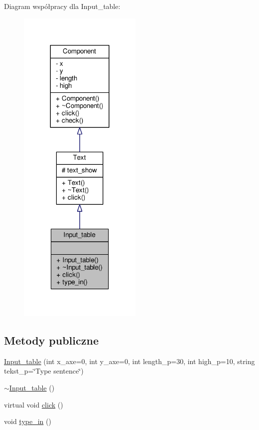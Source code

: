 Diagram współpracy dla Input\+\_\+table\+:
\nopagebreak
\begin{figure}[H]
\begin{center}
\leavevmode
\includegraphics[width=168pt]{classInput__table__coll__graph}
\end{center}
\end{figure}
\subsection*{Metody publiczne}
\begin{DoxyCompactItemize}
\item 
\hyperlink{classInput__table_a45587a7a164f060d4bc10e30e2226e5d}{Input\+\_\+table} (int x\+\_\+axe=0, int y\+\_\+axe=0, int length\+\_\+p=30, int high\+\_\+p=10, string tekst\+\_\+p=\char`\"{}Type sentence\char`\"{})
\item 
\hyperlink{classInput__table_a22e1bdc68b3b830a03474b4897c6d47e}{$\sim$\+Input\+\_\+table} ()
\item 
virtual void \hyperlink{classInput__table_ac48806d103ed557c4b9a4eac4a021cf3}{click} ()
\item 
void \hyperlink{classInput__table_a6a4752b474d1a42c9f48bbb1e8af82a8}{type\+\_\+in} ()
\end{DoxyCompactItemize}
